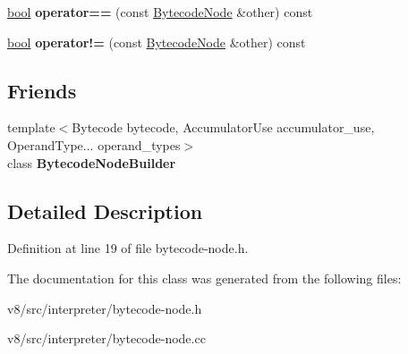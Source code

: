 \begin{DoxyCompactItemize}
\mbox{\hyperlink{classbool}{bool}} {\bfseries operator==} (const \mbox{\hyperlink{classv8_1_1internal_1_1interpreter_1_1BytecodeNode}{Bytecode\+Node}} \&other) const
\item 
\mbox{\label{classv8_1_1internal_1_1interpreter_1_1BytecodeNode_abc4e2002bf796a5bf78178b22a377d53}} 
\mbox{\hyperlink{classbool}{bool}} {\bfseries operator!=} (const \mbox{\hyperlink{classv8_1_1internal_1_1interpreter_1_1BytecodeNode}{Bytecode\+Node}} \&other) const
\end{DoxyCompactItemize}
\subsection*{Friends}
\begin{DoxyCompactItemize}
\item 
\mbox{\label{classv8_1_1internal_1_1interpreter_1_1BytecodeNode_aaae354ff4d905c28732d483438230c93}} 
{\footnotesize template$<$Bytecode bytecode, Accumulator\+Use accumulator\+\_\+use, Operand\+Type... operand\+\_\+types$>$ }\\class {\bfseries Bytecode\+Node\+Builder}
\end{DoxyCompactItemize}


\subsection{Detailed Description}


Definition at line 19 of file bytecode-\/node.\+h.



The documentation for this class was generated from the following files\+:\begin{DoxyCompactItemize}
\item 
v8/src/interpreter/bytecode-\/node.\+h\item 
v8/src/interpreter/bytecode-\/node.\+cc\end{DoxyCompactItemize}
